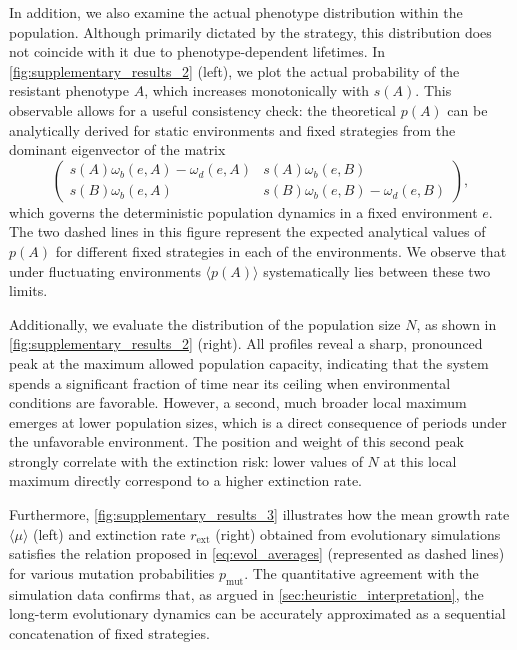 \documentclass[aps,pre,reprint,10pt,superscriptaddress]{revtex4-2}
\begin{document}
\begin{appendices}
    In addition, we also examine the actual phenotype distribution within the population. Although primarily dictated by the strategy, this distribution does not coincide with it due to phenotype-dependent lifetimes. In \cref{fig:supplementary_results_2} (left), we plot the actual probability of the resistant phenotype $A$, which increases monotonically with $s(A)$. This observable allows for a useful consistency check: the theoretical $p(A)$ can be analytically derived for static environments and fixed strategies from the dominant eigenvector of the matrix
    \begin{equation}
        \begin{pmatrix}
            s(A)\omega_b(e,A)-\omega_d(e,A) & s(A)\omega_b(e,B)               \\
            s(B)\omega_b(e,A)               & s(B)\omega_b(e,B)-\omega_d(e,B)
        \end{pmatrix},
    \end{equation}
    which governs the deterministic population dynamics in a fixed environment $e$. The two dashed lines in this figure represent the expected analytical values of $p(A)$ for different fixed strategies in each of the environments. We observe that under fluctuating environments $\langle p(A)\rangle$ systematically lies between these two limits.

    Additionally, we evaluate the distribution of the population size $N$, as shown in \cref{fig:supplementary_results_2} (right). All profiles reveal a sharp, pronounced peak at the maximum allowed population capacity, indicating that the system spends a significant fraction of time near its ceiling when environmental conditions are favorable. However, a second, much broader local maximum emerges at lower population sizes, which is a direct consequence of periods under the unfavorable environment. The position and weight of this second peak strongly correlate with the extinction risk: lower values of $N$ at this local maximum directly correspond to a higher extinction rate.

    Furthermore, \cref{fig:supplementary_results_3} illustrates how the mean growth rate $\langle\mu\rangle$ (left) and extinction rate $r_\text{ext}$ (right) obtained from evolutionary simulations satisfies the relation proposed in \cref{eq:evol_averages} (represented as dashed lines) for various mutation probabilities $p_\text{mut}$. The quantitative agreement with the simulation data confirms that, as argued in \cref{sec:heuristic_interpretation}, the long-term evolutionary dynamics can be accurately approximated as a sequential concatenation of fixed strategies.


\end{appendices}
\end{document}

